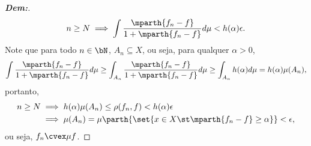 {\begin{enumerate}[label=(\alph*)]
\begin{proof}[\textbf{Dem:}]
\begin{align*}
      n \ge N \implies \int \frac{\mparth{f_n - f}}{1+\mparth{f_n-f}}d\mu < h(\alpha)\epsilon.
    \end{align*}
    Note que para todo $n \in \bN$, $A_n \subseteq X$, ou seja, para qualquer $\alpha>0$, 
    \begin{align*}
      \int \frac{\mparth{f_n - f}}{1+\mparth{f_n-f}}d\mu \ge
      \int_{A_n} \frac{\mparth{f_n - f}}{1+\mparth{f_n-f}}d\mu \ge 
      \int_{A_n} h(\alpha) d\mu =h(\alpha)\mu(A_n),
    \end{align*}
    portanto, 
    \begin{align*}
      n \ge N &\implies h(\alpha)\mu(A_n) \le \rho(f_n , f) < h(\alpha)\epsilon\\
      &\implies \mu(A_n) = \mu\parth{\set{x \in X \st \mparth{f_n - f}\ge \alpha}}<\epsilon,
    \end{align*}
    ou seja, $f_n \cvex \mu f$.
  \end{proof}
\end{enumerate}}

